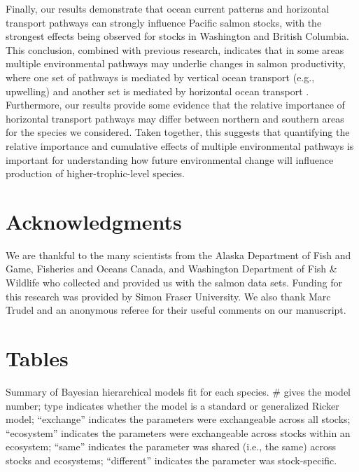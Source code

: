 Finally, our results demonstrate that ocean current patterns and horizontal
transport pathways can strongly influence Pacific salmon stocks, with the
strongest effects being observed for stocks in Washington and British Columbia.
This conclusion, combined with previous research, indicates that in some areas
multiple environmental pathways may underlie changes in salmon productivity,
where one set of pathways is mediated by vertical ocean transport (e.g.,
upwelling) and another set is mediated by horizontal ocean transport
\citep{Ottersen2010a, Malick2015b, DiLorenzo2013b}. Furthermore, our results
provide some evidence that the relative importance of horizontal transport
pathways may differ between northern and southern areas for the species we
considered. Taken together, this suggests that quantifying the relative
importance and cumulative effects of multiple environmental pathways is
important for understanding how future environmental change will influence
production of higher-trophic-level species.


\section{Acknowledgments}

We are thankful to the many scientists from the Alaska Department of Fish and
Game, Fisheries and Oceans Canada, and Washington Department of Fish \& Wildlife
who collected and provided us with the salmon data sets. Funding for this
research was provided by Simon Fraser University. We also thank Marc Trudel and
an anonymous referee for their useful comments on our manuscript.


\section{Tables}

\begin{table}[!ht]
  \small \centering \libertineLF
  \caption[Summary of Bayesian hierarchical models fit for each
           species]{Summary of Bayesian hierarchical models fit for each
           species. \# gives the model number; type indicates whether the
           model is a standard or generalized Ricker model; ``exchange''
           indicates the parameters were exchangeable across all stocks;
           ``ecosystem'' indicates the parameters were exchangeable across
           stocks within an ecosystem; ``same'' indicates the parameter was
           shared (i.e., the same) across stocks and ecosystems; ``different''
           indicates the parameter was stock-specific.}
  
  \label{tab:npc:1}
\end{table}


